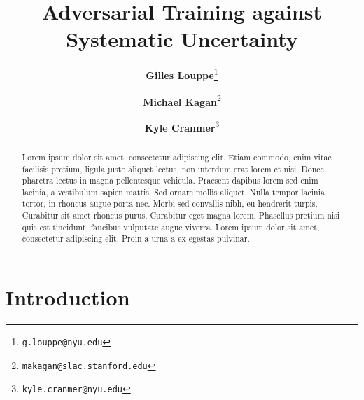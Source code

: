 \documentclass[twocolumn,superscriptaddress,aps]{revtex4-1}
\theoremstyle{plain}
\begin{document}

\title{\Large{Adversarial Training against Systematic Uncertainty}}
\vspace{1cm}
\author{\small{\bf Gilles Louppe}\thanks{\texttt{g.louppe@nyu.edu}}}
\author{\small{\bf Michael Kagan}\thanks{\texttt{makagan@slac.stanford.edu}}}
\author{\small{\bf Kyle Cranmer}\thanks{\texttt{kyle.cranmer@nyu.edu}}}

\begin{abstract}

Lorem ipsum dolor sit amet, consectetur adipiscing elit. Etiam commodo, enim
vitae facilisis pretium, ligula justo aliquet lectus, non interdum erat lorem et
nisi. Donec pharetra lectus in magna pellentesque vehicula. Praesent dapibus
lorem sed enim lacinia, a vestibulum sapien mattis. Sed ornare mollis aliquet.
Nulla tempor lacinia tortor, in rhoncus augue porta nec. Morbi sed convallis
nibh, eu hendrerit turpis. Curabitur sit amet rhoncus purus. Curabitur eget
magna lorem. Phasellus pretium nisi quis est tincidunt, faucibus vulputate augue
viverra. Lorem ipsum dolor sit amet, consectetur adipiscing elit. Proin a urna a
ex egestas pulvinar.

\end{abstract}

\maketitle



\section{Introduction}
\end{document}
